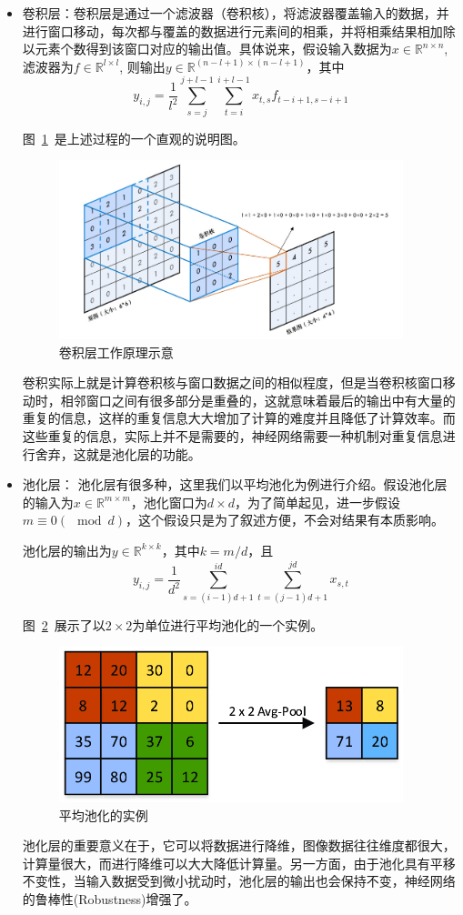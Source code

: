\begin{itemize}
  \item 卷积层：卷积层是通过一个滤波器（卷积核），将滤波器覆盖输入的数据，并进行窗口移动，每次都与覆盖的数据进行元素间的相乘，并将相乘结果相加除以元素个数得到该窗口对应的输出值。具体说来，假设输入数据为$x\in \mathbb{R}^{n\times n}$, 滤波器为$f\in \mathbb{R}^{l\times l}$, 则输出$y\in \mathbb{R}^{(n-l+1)\times (n-l+1)}$，其中
  \[
    y_{i,j} = \frac{1}{l^2}\sum_{s = j}^{j+l-1}\sum_{t = i}^{i+l-1} x_{t,s}f_{t-i+1,s-i+1}
  \]
  \par
  图~\ref{fig:conv}~是上述过程的一个直观的说明图。
  \begin{figure}
  \centering
  \includegraphics[width=10cm]{./figures/conv.jpg}
  \caption{卷积层工作原理示意}
  \label{fig:conv}
  \end{figure}
  \par
  卷积实际上就是计算卷积核与窗口数据之间的相似程度，但是当卷积核窗口移动时，相邻窗口之间有很多部分是重叠的，这就意味着最后的输出中有大量的重复的信息，这样的重复信息大大增加了计算的难度并且降低了计算效率。而这些重复的信息，实际上并不是需要的，神经网络需要一种机制对重复信息进行舍弃，这就是池化层的功能。
  \item 池化层：	池化层有很多种，这里我们以平均池化为例进行介绍。假设池化层的输入为$x\in \mathbb{R}^{m\times m}$，池化窗口为$d\times d$，为了简单起见，进一步假设$m\equiv 0 (\mod d)$，这个假设只是为了叙述方便，不会对结果有本质影响。
  \par
  池化层的输出为$y\in \mathbb{R}^{k\times k}$，其中$k = m/d$，且
  \[
  	y_{i,j} = \frac{1}{d^2}\sum_{s=(i-1)d+1}^{id}\sum_{t=(j-1)d+1}^{jd}x_{s,t}
  \]
  \par
  图~\ref{fig:avgpool}~展示了以$2\times2$为单位进行平均池化的一个实例。
  \begin{figure}
  \centering
  \includegraphics[width=10cm]{./figures/avgpool.png}
  \caption{平均池化的实例}
  \label{fig:avgpool}
  \end{figure}
  \par
  池化层的重要意义在于，它可以将数据进行降维，图像数据往往维度都很大，计算量很大，而进行降维可以大大降低计算量。另一方面，由于池化具有平移不变性，当输入数据受到微小扰动时，池化层的输出也会保持不变，神经网络的鲁棒性(Robustness)增强了。
\end{itemize}
